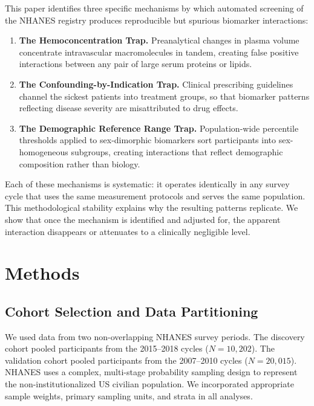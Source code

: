 \documentclass[10pt,letterpaper]{article}
\begin{document}
This paper identifies three specific mechanisms by which automated screening of the NHANES registry produces reproducible but spurious biomarker interactions:
\begin{enumerate}[label=\textbf{\arabic*.}]
    \item \textbf{The Hemoconcentration Trap.} Preanalytical changes in plasma volume concentrate intravascular macromolecules in tandem, creating false positive interactions between any pair of large serum proteins or lipids.
    \item \textbf{The Confounding-by-Indication Trap.} Clinical prescribing guidelines channel the sickest patients into treatment groups, so that biomarker patterns reflecting disease severity are misattributed to drug effects.
    \item \textbf{The Demographic Reference Range Trap.} Population-wide percentile thresholds applied to sex-dimorphic biomarkers sort participants into sex-homogeneous subgroups, creating interactions that reflect demographic composition rather than biology.
\end{enumerate}

Each of these mechanisms is systematic: it operates identically in any survey cycle that uses the same measurement protocols and serves the same population. This methodological stability explains why the resulting patterns replicate. We show that once the mechanism is identified and adjusted for, the apparent interaction disappears or attenuates to a clinically negligible level.

\section{Methods}

\subsection{Cohort Selection and Data Partitioning}
We used data from two non-overlapping NHANES survey periods. The discovery cohort pooled participants from the 2015--2018 cycles ($N = 10,202$). The validation cohort pooled participants from the 2007--2010 cycles ($N = 20,015$). NHANES uses a complex, multi-stage probability sampling design to represent the non-institutionalized US civilian population. We incorporated appropriate sample weights, primary sampling units, and strata in all analyses.
\end{document}
